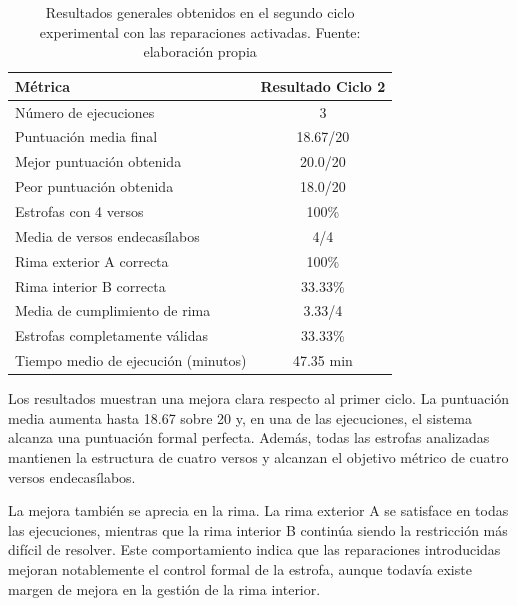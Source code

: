\documentclass[12pt,a4paper,twoside,openright]{book}
\begin{document}
\begin{table}[h]
    \centering
    \begin{tabular}{|l|c|}
        \hline
        \textbf{Métrica} & \textbf{Resultado Ciclo 2} \\
        \hline
        Número de ejecuciones & 3 \\
        \hline
        Puntuación media final & 18.67/20 \\
        \hline
        Mejor puntuación obtenida & 20.0/20 \\
        \hline
        Peor puntuación obtenida & 18.0/20 \\
        \hline
        Estrofas con 4 versos & 100\% \\
        \hline
        Media de versos endecasílabos & 4/4 \\
        \hline
        Rima exterior A correcta & 100\% \\
        \hline
        Rima interior B correcta & 33.33\% \\
        \hline
        Media de cumplimiento de rima & 3.33/4 \\
        \hline
        Estrofas completamente válidas & 33.33\% \\
        \hline
        Tiempo medio de ejecución (minutos) & 47.35 min \\
        \hline
    \end{tabular}
    \caption{Resultados generales obtenidos en el segundo ciclo experimental con las reparaciones activadas. Fuente: elaboración propia}
    \label{tab:resultadosCiclo2}
\end{table}

Los resultados muestran una mejora clara respecto al primer ciclo. La puntuación media aumenta hasta 18.67 sobre 20 y, en una de las ejecuciones, el sistema alcanza una puntuación formal perfecta.
Además, todas las estrofas analizadas mantienen la estructura de cuatro versos y alcanzan el objetivo métrico de cuatro versos endecasílabos.

La mejora también se aprecia en la rima. La rima exterior A se satisface en todas las ejecuciones, mientras que la rima interior B continúa siendo la restricción más difícil de resolver.
Este comportamiento indica que las reparaciones introducidas mejoran notablemente el control formal de la estrofa, aunque todavía existe margen de mejora en la gestión de la rima interior.
\end{document}
